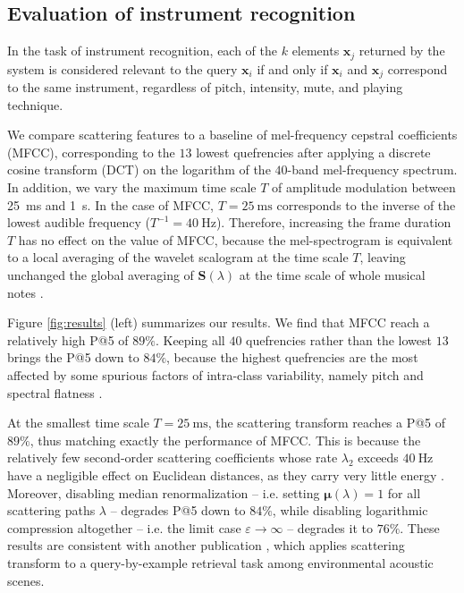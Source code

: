 \documentclass{article}
\makeatletter
\newcommand*{\ie}{i.e.\@\xspace}
\makeatother
\begin{document}
\subsection{Evaluation of instrument recognition}

In the task of instrument recognition, each of the $k$ elements $\boldsymbol{x}_j$ returned by the system is considered relevant to the query $\boldsymbol{x}_i$ if and only if $\boldsymbol{x}_i$ and $\boldsymbol{x}_j$ correspond to the same instrument, regardless of pitch, intensity, mute, and playing technique.

We compare scattering features to a baseline of mel-frequency cepstral coefficients (MFCC), corresponding to the $13$ lowest quefrencies after applying a discrete cosine transform (DCT) on the logarithm of the $40$-band mel-frequency spectrum.
In addition, we vary the maximum time scale $T$ of amplitude modulation between \SI{25}{\milli\second} and  \SI{1}{\second}.
In the case of MFCC, $T=\SI{25}{\milli\second}$ corresponds to the inverse of the lowest audible frequency ($T^{-1}=\SI{40}{\Hz}$).
Therefore, increasing the frame duration $T$ has no effect on the value of MFCC, because the mel-spectrogram is equivalent to a local averaging of the wavelet scalogram at the time scale $T$, leaving unchanged the global averaging of $\mathbf{S}(\lambda)$ at the time scale of whole musical notes \cite{anden2012dafx}.

Figure \ref{fig:results} (left) summarizes our results.
We find that MFCC reach a relatively high P@5 of $89\%$.
Keeping all $40$ quefrencies rather than the lowest $13$ brings the P@5 down to $84\%$, because the highest quefrencies are the most affected by some spurious factors of intra-class variability, namely pitch and spectral flatness \cite{lostanlen2017phd}.

At the smallest time scale $T=\SI{25}{\milli\second}$, the scattering transform reaches a P@5 of $89\%$, thus matching exactly the performance of MFCC.
This is because the relatively few second-order scattering coefficients whose rate $\lambda_2$ exceeds $\SI{40}{\Hz}$ have a negligible effect on Euclidean distances, as they carry very little energy \cite{anden2014taslp}.
Moreover, disabling median renormalization -- \ie{} setting $\boldsymbol{\mu}(\lambda) = 1$ for all scattering paths $\lambda$ -- degrades P@5 down to $84\%$, while disabling logarithmic compression altogether -- \ie{} the limit case $\varepsilon \rightarrow \infty$ -- degrades it to $76\%$.
These results are consistent with another publication \cite{lostanlen2018eurasip}, which applies scattering transform to a query-by-example retrieval task among environmental acoustic scenes.
\end{document}
